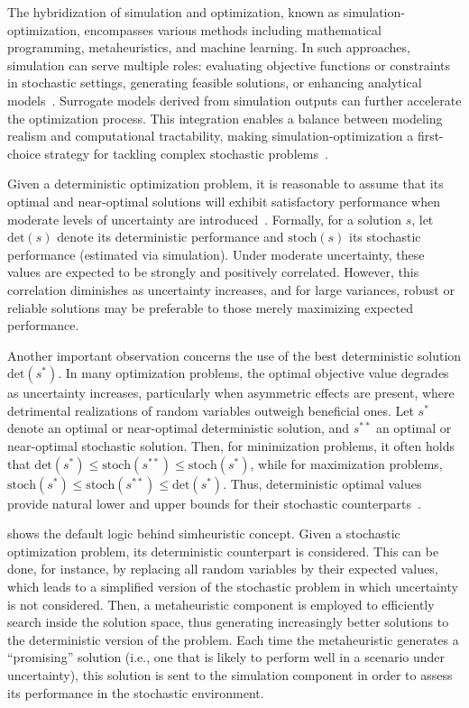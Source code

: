 The hybridization of simulation and optimization, known as
simulation-optimization, encompasses various methods including mathematical
programming, metaheuristics, and machine learning. In such approaches,
simulation can serve multiple roles: evaluating objective functions or
constraints in stochastic settings, generating feasible solutions, or enhancing
analytical models~\cite{juan:2015}. Surrogate models derived from simulation
outputs can further accelerate the optimization process. This integration
enables a balance between modeling realism and computational tractability,
making simulation-optimization a first-choice strategy for tackling complex
stochastic problems~\cite{juan:2022}.

Given a deterministic optimization problem, it is reasonable to assume that its
optimal and near-optimal solutions will exhibit satisfactory performance when
moderate levels of uncertainty are introduced~\cite{juan:2022}. Formally, for a
solution $s$, let $\text{det}(s)$ denote its deterministic performance and
$\text{stoch}(s)$ its stochastic performance (estimated via simulation). Under
moderate uncertainty, these values are expected to be strongly and positively
correlated. However, this correlation diminishes as uncertainty increases, and
for large variances, robust or reliable solutions may be preferable to those
merely maximizing expected performance.

Another important observation concerns the use of the best deterministic
solution $\text{det}(s^*)$. In many optimization problems, the optimal objective
value degrades as uncertainty increases, particularly when asymmetric effects
are present, where detrimental realizations of random variables outweigh
beneficial ones. Let $s^*$ denote an optimal or near-optimal deterministic
solution, and $s^{**}$ an optimal or near-optimal stochastic solution. Then, for
minimization problems, it often holds that $\text{det}(s^*) \leq
	\text{stoch}(s^{**}) \leq \text{stoch}(s^*)$, while for maximization problems,
$\text{stoch}(s^*) \leq \text{stoch}(s^{**}) \leq \text{det}(s^*)$. Thus,
deterministic optimal values provide natural lower and upper bounds for their
stochastic counterparts~\cite{juan:2022}.

 shows the default logic behind simheuristic
concept. Given a stochastic optimization problem, its deterministic counterpart
is considered. This can be done, for instance, by replacing all random variables
by their expected values, which leads to a simplified version of the stochastic
problem in which uncertainty is not considered. Then, a metaheuristic component
is employed to efficiently search inside the solution space, thus generating
increasingly better solutions to the deterministic version of the problem. Each
time the metaheuristic generates a ``promising'' solution (i.e., one that is
likely to perform well in a scenario under uncertainty), this solution is sent
to the simulation component in order to assess its performance in the stochastic
environment. 

